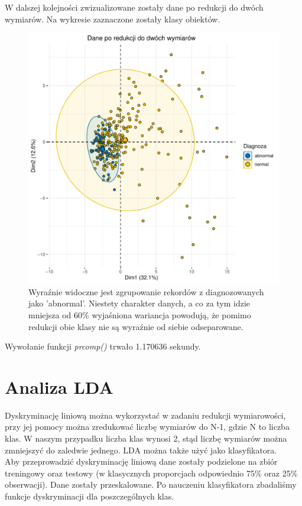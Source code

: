 \documentclass[10pt,a4paper]{article}
\begin{document}
W dalszej kolejności zwizualizowane zostały dane po redukcji do dwóch wymiarów. Na wykresie zaznaczone zostały klasy obiektów.

\begin{figure}[H]
\includegraphics[scale=0.5]{klasy.pdf}
\caption{Wyraźnie widoczne jest zgrupowanie rekordów z diagnozowanych jako 'abnormal'. Niestety charakter danych, a co za tym idzie mniejsza od 60\% wyjaśniona wariancja powodują, że pomimo redukcji obie klasy nie są wyraźnie od siebie odseparowane.}
\end{figure}
Wywołanie funkcji \textit{prcomp()} trwało 1.170636 sekundy.

\newpage
\section{Analiza LDA}
Dyskryminację liniową można wykorzystać w zadaniu redukcji wymiarowości, przy jej pomocy można zredukować liczbę wymiarów do N-1, gdzie N to liczba klas. W naszym przypadku liczba klas wynosi 2, stąd liczbę wymiarów można zmniejszyć do zaledwie jednego. LDA można także użyć jako klasyfikatora.
\\Aby przeprowadzić dyskryminację liniową dane zostały podzielone na zbiór treningowy oraz testowy (w klasycznych proporcjach odpowiednio 75\% oraz 25\% obserwacji). Dane zostały przeskalowane. Po nauczeniu klasyfikatora zbadaliśmy funkcje dyskryminacji dla poszczególnych klas.
\end{document}
